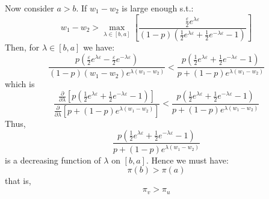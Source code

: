 \documentclass{article}
\begin{document}
	Now consider $a>b$. If $w_1 - w_2$ is large enough s.t.:
	\begin{equation}
		w_1 - w_2 > \max_{\lambda \in [b,a]} \left[ \frac{\frac{\varepsilon}{2}e^{\lambda\varepsilon}}{(1-p)\left( \frac{1}{2} e^{\lambda \varepsilon} + \frac{1}{2} e^{-\lambda \varepsilon} -1 \right)} \right]
	\end{equation}
	Then, for $\lambda \in [b,a]$ we have:
	\begin{equation}
		\frac{p \left( \frac{\varepsilon}{2} e^{\lambda \varepsilon} - \frac{\varepsilon}{2} e^{-\lambda \varepsilon} \right) }{(1-p)(w_1 - w_2)e^{\lambda (w_1 - w_2)} }<\frac{p \left( \frac{1}{2} e^{\lambda \varepsilon} + \frac{1}{2} e^{-\lambda \varepsilon} -1 \right)}{p + (1-p) e^{\lambda (w_1 - w_2)} }
	\end{equation}
	which is
	\begin{equation}
		\frac{\frac{\partial}{\partial \lambda} \left[ p \left( \frac{1}{2} e^{\lambda \varepsilon} + \frac{1}{2} e^{-\lambda \varepsilon} -1 \right) \right]}{\frac{\partial}{\partial \lambda} \left[ p + (1-p) e^{\lambda (w_1 - w_2)} \right]} < \frac{p \left( \frac{1}{2} e^{\lambda \varepsilon} + \frac{1}{2} e^{-\lambda \varepsilon} -1 \right)}{p + (1-p) e^{\lambda (w_1 - w_2)} }
	\end{equation}
	Thus,  
	\begin{equation}
		\frac{p \left( \frac{1}{2} e^{\lambda \varepsilon} + \frac{1}{2} e^{-\lambda \varepsilon} -1 \right)}{p + (1-p) e^{\lambda (w_1 - w_2)} }
	\end{equation}
	is a decreasing function of $\lambda$ on $[b,a]$. Hence we must have:
	\begin{equation}
		\pi(b) > \pi(a)
	\end{equation}
	that is,
	\begin{equation}
		\pi_v > \pi_u
	\end{equation}
\end{document}
